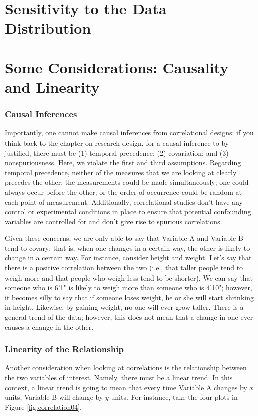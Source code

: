 \section{Sensitivity to the Data Distribution}

\section{Some Considerations: Causality and Linearity}
\subsubsection{Causal Inferences}
Importantly, one cannot make causal inferences from correlational designs: if you think back to the chapter on research design, for a causal inference to by justified, there must be (1) temporal precedence; (2) covariation; and (3) nonspuriousness. Here, we violate the first and third assumptions. Regarding temporal precedence, neither of the measures that we are looking at clearly precedes the other: the measurements could be made simultaneously; one could always occur before the other; or the order of occurrence could be random at each point of measurement. Additionally, correlational studies don't have any control or experimental conditions in place to ensure that potential confounding variables are controlled for and don't give rise to spurious correlations.

Given these concerns, we are only able to say that Variable A and Variable B tend to covary: that is, when one changes in a certain way, the other is likely to change in a certain way. For instance, consider height and weight. Let's say that there is a positive correlation between the two (i.e., that taller people tend to weigh more and that people who weigh less tend to be shorter). We can say that someone who is 6'1" is likely to weigh more than someone who is 4'10"; however, it becomes silly to say that if someone loses weight, he or she will start shrinking in height. Likewise, by gaining weight, no one will ever grow taller. There is a general trend of the data; however, this does not mean that a change in one ever causes a change in the other.

\subsubsection{Linearity of the Relationship}
Another consideration when looking at correlations is the relationship between the two variables of interest. Namely, there must be a linear trend. In this context, a linear trend is going to mean that every time Variable A changes by \( x \) units, Variable B will change by \(y\) units. For instance, take the four plots in Figure \ref{fig:correlation04}.

